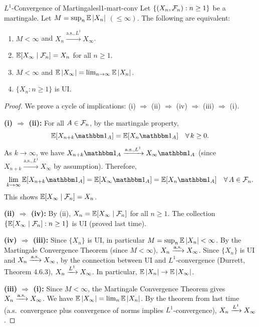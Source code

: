 \begin{theorem}{\texorpdfstring{$L^1$}{L1}-Convergence of Martingales}{l1-mart-conv}
    Let $\{(X_n, \mathcal{F}_n) : n \geq 1\}$ be a martingale. Let $M = \sup_{n} \mathbb{E}\left|X_n\right|$ $(\leq \infty)$. The following are equivalent:
    \begin{enumerate}[label=(\roman*)]
        \item $M < \infty$ and $X_n \xrightarrow{\text{a.s.}, L^1} X_\infty$.
        \item $\mathbb{E}[X_\infty \mid \mathcal{F}_n] = X_n$ for all $n \geq 1$.
        \item $M < \infty$ and $\mathbb{E}\left|X_\infty\right| = \lim_{n \to \infty} \mathbb{E}\left|X_n\right|$.
        \item $\{X_n : n \geq 1\}$ is UI.
    \end{enumerate}
\end{theorem}

\begin{proof}
    We prove a cycle of implications: (i) $\Rightarrow$ (ii) $\Rightarrow$ (iv) $\Rightarrow$ (iii) $\Rightarrow$ (i).

    \medskip
    \textbf{(i) $\Rightarrow$ (ii):}
    For all $A \in \mathcal{F}_n$, by the martingale property,
    \[
        \E[X_{n+k} \ind_A] = \E[X_n \ind_A] \quad \forall\, k \geq 0.
    \]
    As $k \to \infty$, we have $X_{n+k} \ind_A \xrightarrow{\text{a.s.}, L^1} X_\infty \ind_A$ (since $X_{n+k} \xrightarrow{\text{a.s.}, L^1} X_\infty$ by assumption). Therefore,
    \[
        \lim_{k \to \infty} \E[X_{n+k} \ind_A] = \E[X_\infty \ind_A] = \E[X_n \ind_A] \quad \forall\, A \in \F_n.
    \]
    This shows $\mathbb{E}[X_\infty \mid \mathcal{F}_n] = X_n$.

    \medskip
    \textbf{(ii) $\Rightarrow$ (iv):}
    By (ii), $X_n = \mathbb{E}[X_\infty \mid \mathcal{F}_n]$ for all $n \geq 1$. The collection $\{\mathbb{E}[X_\infty \mid \mathcal{F}_n] : n \geq 1\}$ is UI (proved last time).

    \medskip
    \textbf{(iv) $\Rightarrow$ (iii):}
    Since $\{X_n\}$ is UI, in particular $M = \sup_n \mathbb{E}\left|X_n\right| < \infty$. By the Martingale Convergence Theorem (since $M < \infty$), $X_n \xrightarrow{\text{a.s.}} X_\infty$. Since $\{X_n\}$ is UI and $X_n \xrightarrow{\text{a.s.}} X_\infty$, by the connection between UI and $L^1$-convergence (Durrett, Theorem 4.6.3), $X_n \xrightarrow{L^{1}} X_\infty$. In particular, $\mathbb{E}\left|X_n\right| \to \mathbb{E}\left|X_\infty\right|$.

    \medskip
    \textbf{(iii) $\Rightarrow$ (i):}
    Since $M < \infty$, the Martingale Convergence Theorem gives $X_n \xrightarrow{\text{a.s.}} X_\infty$. We have $\mathbb{E}\left|X_\infty\right| = \lim_n \mathbb{E}\left|X_n\right|$. By the theorem from last time (a.s.\ convergence plus convergence of norms implies $L^1$-convergence), $X_n \xrightarrow{L^{1}} X_\infty$.
\end{proof}

